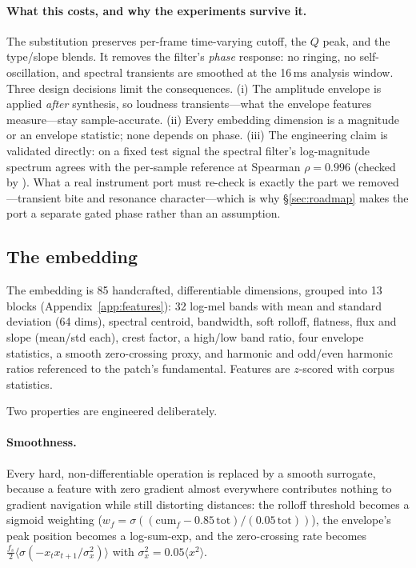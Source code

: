 \documentclass[11pt]{article}
\newcommand{\code}[1]{\texttt{\detokenize{#1}}}
\begin{document}
\paragraph{What this costs, and why the experiments survive it.}
The substitution preserves per-frame time-varying cutoff, the $Q$ peak, and the
type/slope blends. It removes the filter's \emph{phase} response: no ringing, no
self-oscillation, and spectral transients are smoothed at the 16\,ms analysis
window. Three design decisions limit the consequences. (i) The amplitude
envelope is applied \emph{after} synthesis, so loudness transients---what the
envelope features measure---stay sample-accurate. (ii) Every embedding
dimension is a magnitude or an envelope statistic; none depends on phase.
(iii) The engineering claim is validated directly: on a fixed test signal the
spectral filter's log-magnitude spectrum agrees with the per-sample reference at
Spearman $\rho = 0.996$ (checked by \code{sanity}). What a real instrument port
must re-check is exactly the part we removed---transient bite and resonance
character---which is why \S\ref{sec:roadmap} makes the port a separate gated
phase rather than an assumption.

\subsection{The embedding}\label{sec:embedding}

The embedding is 85 handcrafted, differentiable dimensions, grouped into 13
blocks (Appendix~\ref{app:features}): 32 log-mel bands with mean and standard
deviation (64 dims), spectral centroid, bandwidth, soft rolloff, flatness, flux
and slope (mean/std each), crest factor, a high/low band ratio, four envelope
statistics, a smooth zero-crossing proxy, and harmonic and odd/even harmonic
ratios referenced to the patch's fundamental. Features are $z$-scored with
corpus statistics.

Two properties are engineered deliberately.

\paragraph{Smoothness.} Every hard, non-differentiable operation is replaced by
a smooth surrogate, because a feature with zero gradient almost everywhere
contributes nothing to gradient navigation while still distorting distances:
the rolloff threshold becomes a sigmoid weighting
($w_f = \sigma((\mathrm{cum}_f - 0.85\,\mathrm{tot})/(0.05\,\mathrm{tot}))$),
the envelope's peak position becomes a log-sum-exp, and the zero-crossing rate
becomes $\tfrac{f_s}{2}\langle \sigma(-x_t x_{t+1}/\sigma_x^2)\rangle$ with
$\sigma_x^2 = 0.05\langle x^2\rangle$.
\end{document}
